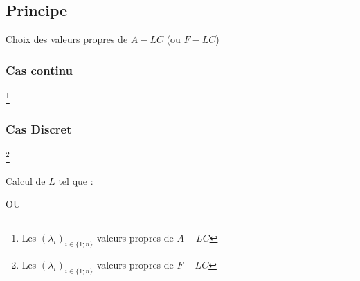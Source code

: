 \subsection{Principe}
Choix des valeurs propres de $A - LC$ (ou $F - LC$)
\subsubsection{Cas continu}
\begin{center}
    \Large{} 
    \footnote{Les $(\lambda_{i})_{i \in \{1;n\}}$ valeurs propres de $A - LC$}
\end{center} 
\subsubsection{Cas Discret}
\begin{center}
    \Large{} 
    \footnote{Les $(\lambda_{i})_{i \in \{1;n\}}$ valeurs propres de $F - LC$}
\end{center} 
Calcul de $L$ tel que :
\begin{center}
    \Large{}
\end{center}
OU
\begin{center}
    \Large{}
\end{center}